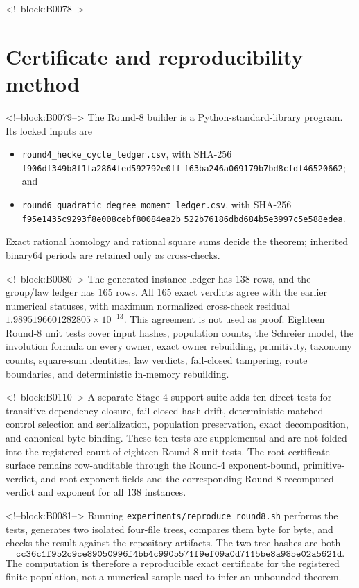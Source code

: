 \documentclass[11pt]{article}
\theoremstyle{definition}
\theoremstyle{remark}
\begin{document}
<!--block:B0078-->
\section{Certificate and reproducibility method}\label{sec:repro}

<!--block:B0079-->
The Round-8 builder is a Python-standard-library program. Its locked inputs are
\begin{itemize}
\item \texttt{round4\_hecke\_cycle\_ledger.csv}, with
\newline SHA-256
\texttt{f906df349b8f1fa2864fed592792e0ff}\newline
\texttt{f63ba246a069179b7bd8cfdf46520662}; and
\item \texttt{round6\_quadratic\_degree\_moment\_ledger.csv}, with
\newline SHA-256
\texttt{f95e1435c9293f8e008cebf80084ea2b}\newline
\texttt{522b76186dbd684b5e3997c5e588edea}.
\end{itemize}
Exact rational homology and rational square sums decide the theorem; inherited binary64 periods are retained only as cross-checks.

<!--block:B0080-->
The generated instance ledger has 138 rows, and the group/law ledger has 165 rows. All 165 exact verdicts agree with the earlier numerical statuses, with maximum normalized cross-check residual $1.9895196601282805\times10^{-13}$. This agreement is not used as proof. Eighteen Round-8 unit tests cover input hashes, population counts, the Schreier model, the involution formula on every owner, exact owner rebuilding, primitivity, taxonomy counts, square-sum identities, law verdicts, fail-closed tampering, route boundaries, and deterministic in-memory rebuilding.

<!--block:B0110-->
A separate Stage-4 support suite adds ten direct tests for transitive dependency closure, fail-closed hash drift, deterministic matched-control selection and serialization, population preservation, exact decomposition, and canonical-byte binding. These ten tests are supplemental and are not folded into the registered count of eighteen Round-8 unit tests. The root-certificate surface remains row-auditable through the Round-4 exponent-bound, primitive-verdict, and root-exponent fields and the corresponding Round-8 recomputed verdict and exponent for all 138 instances.

<!--block:B0081-->
Running \texttt{experiments/reproduce\_round8.sh} performs the tests, generates two isolated four-file trees, compares them byte for byte, and checks the result against the repository artifacts. The two tree hashes are both
\[
\texttt{cc36c1f952c9ce89050996f4bb4c9905571f9ef09a0d7115be8a985e02a5621d}.
\]
The computation is therefore a reproducible exact certificate for the registered finite population, not a numerical sample used to infer an unbounded theorem.
\end{document}
